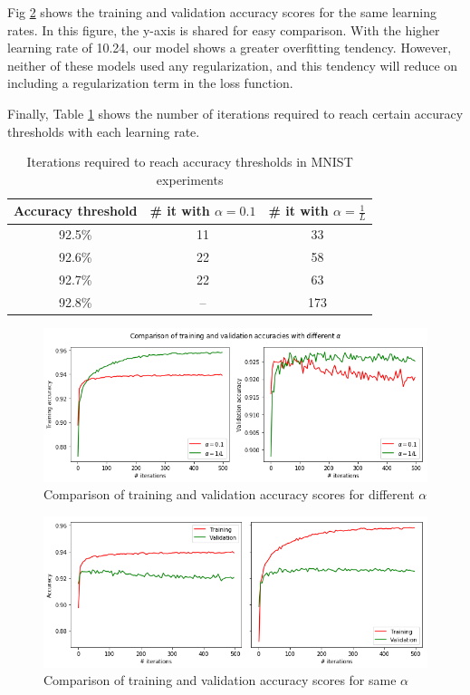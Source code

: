 \documentclass{article}
\begin{document}
Fig \ref{fig:classif:2} shows the training and validation accuracy scores for the same learning rates. In this figure, the y-axis is shared for easy comparison. With the higher learning rate of 10.24, our model shows a greater overfitting tendency. However, neither of these models used any regularization, and this tendency will reduce on including a regularization term in the loss function.

Finally, Table \ref{tab:classif:4} shows the number of iterations required to reach certain accuracy thresholds with each learning rate.

\begin{table}
    \caption{Iterations required to reach accuracy thresholds in MNIST experiments}
    \centering
    \begin{tabular}{ccc}
        \toprule
        Accuracy threshold & \# it with $\alpha=0.1$ & \# it with $\alpha=\frac{1}{L}$ \\
        \midrule
        92.5\% & 11 & 33 \\
        92.6\% & 22 & 58 \\
        92.7\% & 22 & 63 \\
        92.8\% & -- & 173 \\
        \bottomrule
    \end{tabular}
    \label{tab:classif:4}
\end{table}

\begin{figure}
    \centering
    \includegraphics[scale=0.5]{mnist_acc.png}
    \caption{Comparison of training and validation accuracy scores for different $\alpha$}
    \label{fig:classif:1}
\end{figure}

\begin{figure}
    \centering
    \includegraphics[scale=0.5]{mnist_train_val.png}
    \caption{Comparison of training and validation accuracy scores for same $\alpha$}
    \label{fig:classif:2}
\end{figure}
\end{document}
